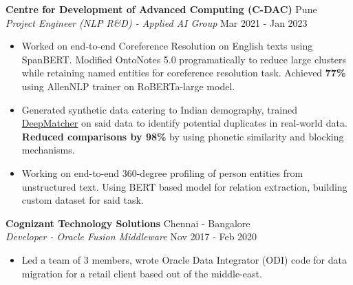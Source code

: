 \documentclass[a4paper]{article}
\begin{document}
\vspace{1mm}
\textbf{Centre for Development of Advanced Computing (C-DAC)} \hfill Pune\\
\textit{Project Engineer (NLP R\&D) - Applied AI Group} \hfill Mar 2021 - Jan 2023\\
\vspace{-1mm}
\begin{itemize} \itemsep 1pt
    \item Worked on end-to-end Coreference Resolution on English texts using SpanBERT. Modified OntoNotes 5.0 programatically to reduce large clusters while retaining named entities for coreference resolution task. Achieved \textbf{77\%} using AllenNLP trainer on RoBERTa-large model.
    \item Generated synthetic data catering to Indian demography, trained \href{https://github.com/anhaidgroup/deepmatcher}{DeepMatcher} on said data to identify potential duplicates in real-world data. \textbf{Reduced comparisons by 98\%} by using phonetic similarity and blocking mechanisms.
    \item Working on end-to-end 360-degree profiling of person entities from unstructured text. Using BERT based model for relation extraction, building custom dataset for said task.
\end{itemize}

\vspace*{2mm}

\textbf{Cognizant Technology Solutions} \hfill Chennai - Bangalore\\
\textit{Developer - Oracle Fusion Middleware} \hfill Nov 2017 - Feb 2020\\
\vspace{-1mm}
\begin{itemize} \itemsep 1pt
    \item Led a team of 3 members, wrote Oracle Data Integrator (ODI) code for data migration for a retail client based out of the middle-east.
\end{itemize}
\end{document}
